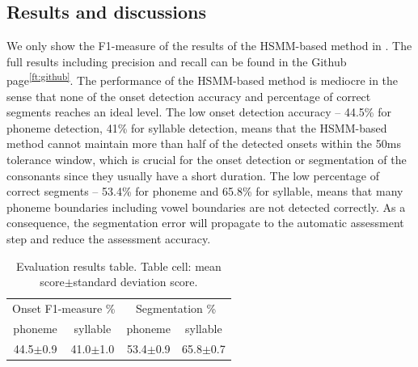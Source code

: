 \subsection{Results and discussions}\label{sec:ch5:results_hsmm}

We only show the F1-measure of the results of the \gls{HSMM}-based method in . The full results including precision and recall can be found in the Github page\textsuperscript{\ref{ft:github}}. The performance of the \gls{HSMM}-based method is mediocre in the sense that none of the onset detection accuracy and percentage of correct segments reaches an ideal level. The low onset detection accuracy -- 44.5\% for phoneme detection, 41\% for syllable detection, means that the \gls{HSMM}-based method cannot maintain more than half of the detected onsets within the 50ms tolerance window, which is crucial for the onset detection or segmentation of the consonants since they usually have a short duration. The low percentage of correct segments -- 53.4\% for phoneme and 65.8\% for syllable, means that many phoneme boundaries including vowel boundaries are not detected correctly. As a consequence, the segmentation error will propagate to the automatic assessment step and reduce the assessment accuracy. 

\begin{table}[ht]
  \centering
  \caption{Evaluation results table. Table cell: mean score$\pm$standard deviation score.}
  \label{table:ch5:results_hsmm}
  \begin{tabular}{cccc}
    \toprule
        \multicolumn{2}{c}{Onset F1-measure \%} & \multicolumn{2}{c}{Segmentation \%} \\
    phoneme & syllable &  phoneme & syllable \\
    \midrule
    44.5$\pm$0.9 & 41.0$\pm$1.0 & 53.4$\pm$0.9 & 65.8$\pm$0.7 \\
    \bottomrule
  \end{tabular}
\end{table}

